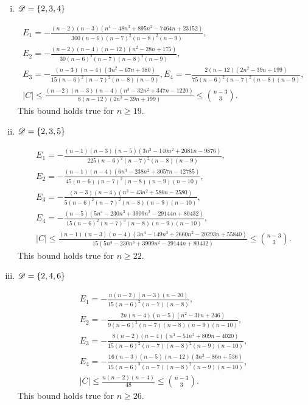\documentclass{amsart}
\begin{document}
{\begin{enumerate}[(i)]
\item $\mathscr{D}=\{2,3,4\}$

\begin{gather*}
E_1=-\frac{(n-2)(n-3)\left(n^4-48n^3+895n^2-7464n+23152\right)}{300(n-6) (n-7)^2(n-8)^2(n-9)},\\ E_2=-\frac{(n-2)(n-4)(n-12)\left(n^2-28n+175\right)}{30(n-6)^2(n-7)(n-8)^2(n-9)},\\ 
E_3=-\frac{(n-3)(n-4)\left(3n^2-67n+380\right)}{15(n-6)^2(n-7)^2(n-8)(n-9)},
E_4=-\frac{2(n-12)\left(2n^2-39n+199\right)}{75(n-6)^2(n-7)^2(n-8)(n-9)},\\
|C|\le \frac{(n-2)(n-3)(n-4)\left(n^3-32n^2+347n-1220\right)}{8(n-12)\left(2n^2-39n+199\right)} \leq \binom{n-3}{3}.
\end{gather*}
This bound holds true for $n\ge 19.$

\item $\mathscr{D}=\{2,3,5\}$

\begin{gather*}
E_1=-\frac{(n-1)(n-3)(n-5)\left(3n^3-140n^2+2081n-9876\right)}{225(n-6)^2(n-7)^2(n-8)(n-9)},\\ E_2=-\frac{(n-1)(n-4)\left(6n^3-238n^2+3057n-12785\right)}{45(n-6)(n-7)^2(n-8)(n-9)(n-10)},\\ E_3=-\frac{(n-3)(n-4)\left(n^3-43n^2+586n-2580\right)}{5(n-6)^2(n-7)^2(n-8)(n-9)(n-10)},\\
E_4=-\frac{(n-5)\left(5n^4-230n^3+3909n^2-29144n+80432\right)}{15(n-6)^2(n-7)^3(n-8)(n-9)(n-10)},\\
|C|\le \frac{(n-1)(n-3)(n-4)\left(3n^4-149n^3+2660n^2-20293n+55840\right)}{15\left(5n^4-230n^3+3909n^2-29144n+80432\right)} \leq \binom{n-3}{3}.
\end{gather*}
This bound holds true for $n\ge 22.$

\item $\mathscr{D}=\{2,4,6\}$

\begin{gather*}
E_1=-\frac{n(n-2)(n-3)(n-20)}{15(n-6)^2(n-7)(n-8)}, \\
E_2=-\frac{2n(n-4)(n-5)\left(n^2-31n+246\right)}{9(n-6)^2(n-7)(n-8)(n-9)(n-10)},\\ 
E_3=-\frac{8(n-2)(n-4)\left(n^3-51n^2+809n-4020\right)}{15(n-6)^2(n-7)(n-8)^2(n-9)(n-10)},\\
E_4=-\frac{16(n-3)(n-5)(n-12)\left(3n^2-86n+536\right)}{15(n-6)^3(n-7)(n-8)^2(n-9)(n-10)},\\
|C|\le \frac{n(n-2)(n-4)}{48} \leq \binom{n-3}{3}.
\end{gather*}
This bound holds true for $n\ge 26.$


\end{enumerate}}
\end{document}
